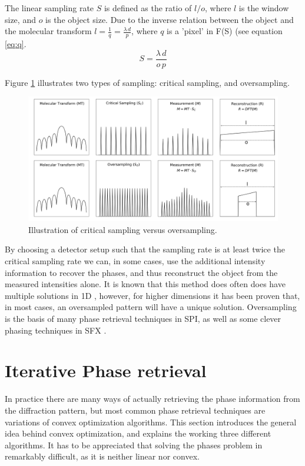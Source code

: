 The linear sampling rate $S$ is defined as the ratio of $l/o$, where $l$ is the window size, and $o$ is the object size. Due to the inverse relation between the object and the molecular transform $l = \frac{1}{q} = \frac{\lambda\, d}{p}$, where $q$ is a 'pixel' in F(S) (see equation \ref{eq:q}. 
\begin{equation}
S = \frac{\lambda\,d}{o\,p}
\end{equation}

Figure \ref{fig:sampling} illustrates two types of sampling: critical sampling, and oversampling.

\begin{figure}[h]
	\centering 
		\includegraphics[width=120mm]{sampling.png}
	\caption{Illustration of critical sampling versus 		oversampling.}
	\label{fig:sampling}
\end{figure}

By choosing a detector setup such that the sampling rate is at least twice the critical sampling rate we can, in some cases, use the additional intensity information to recover the phases, and thus reconstruct the object from the measured intensities alone. It is known that this method does often does have multiple solutions in 1D \cite{Walther1963}, however, for higher dimensions it has been proven that, in most cases, an oversampled pattern will have a unique solution\cite{Bruck1979}. Oversampling is the basis of many phase retrieval techniques in SPI, as well as some clever phasing techniques in SFX \cite{Ayyer2016,Chapman2011}.

\section{Iterative Phase retrieval}
In practice there are many ways of actually retrieving the phase information from the diffraction pattern, but most common phase retrieval techniques are variations of convex optimization algorithms. This section introduces the general idea behind convex optimization, and explains the working three different algorithms. It has to be appreciated that solving the phases problem in remarkably difficult, as it is neither linear nor convex.

